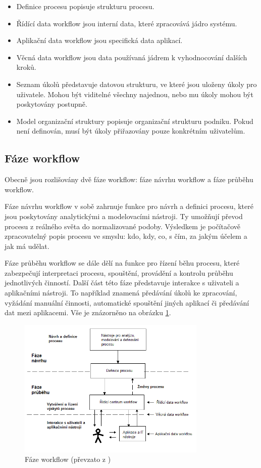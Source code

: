 \documentclass{fithesis}
\begin{document}
\begin{itemize}
\item Definice procesu popisuje strukturu procesu.
\item Řídící data workflow jsou interní data, které zpracovává jádro systému.
\item Aplikační data workflow jsou specifická data aplikací.
\item Věcná data workflow jsou data používaná jádrem k vyhodnocování dalších kroků.
\item Seznam úkolů představuje datovou strukturu, ve které jsou uloženy úkoly pro uživatele. Mohou být viditelné všechny najednou, nebo mu úkoly mohou být poskytovány postupně.
\item Model organizační struktury popisuje organizační strukturu podniku. Pokud není definován, musí být úkoly přiřazovány pouze konkrétním uživatelům.
\end{itemize}

\subsection*{Fáze workflow}
Obecně jsou rozlišovány dvě fáze workflow: fáze návrhu workflow a fáze průběhu workflow. \cite{workflow}

Fáze návrhu workflow v sobě zahrnuje funkce pro návrh a definici procesu, které jsou poskytovány analytickými a modelovacími nástroji. Ty umožňují převod procesu z reálného světa do normalizované podoby. Výsledkem je počítačově zpracovatelný popis procesu ve smyslu: kdo, kdy, co, s čím, za jakým účelem a jak má udělat.

Fáze průběhu workflow se dále dělí na funkce pro řízení běhu procesu, které zabezpečují interpretaci procesu, spouštění, provádění a kontrolu průběhu jednotlivých činností. Další část této fáze představuje interakce s uživateli a aplikačními nástroji. To například znamená předávání úkolů ke zpracování, vyžádání manuální činnosti, automatické spouštění jiných aplikací či předávání dat mezi aplikacemi. Vše je znázorněno na obrázku \ref{fig:faze_workflow_obr}.

\begin{figure}[htp]
\centering
\includegraphics[width=340px]{images/faze_workflow.png}
\caption{Fáze workflow (převzato z \cite{wfmc})}
\label{fig:faze_workflow_obr}
\end{figure}
\end{document}
